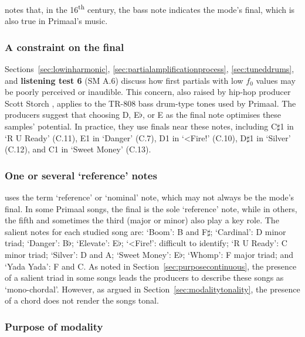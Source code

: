 \documentclass{article}
\begin{document}
\citet[p.~42]{coeurdevey1998histoire} notes that, in the 16\textsuperscript{th} century, the bass note indicates the mode's final, which is also true in Primaal's music. %


\subsubsection{A constraint on the final}

Sections~\ref{sec:lowinharmonic}, \ref{sec:partialamplificationprocess}, \ref{sec:tuneddrums}, and \textbf{listening test 6} (SM A.6) discuss how first partials with low $f_0$ values may be poorly perceived or inaudible. This concern, also raised by hip-hop producer Scott Storch \citep{deruty2024storch}, applies to the TR-808 bass drum-type tones used by Primaal. The producers suggest that choosing D, E$\flat$, or E as the final note optimises these samples' potential. In practice, they use finals near these notes, including C$\sharp$1 in `R U Ready' (C.11), E1 in `Danger' (C.7), D1 in `<Fire!' (C.10), D$\sharp$1 in `Silver' (C.12), and C1 in `Sweet Money' (C.13).


\subsubsection{One or several `reference' notes}

\citet{meeus2023theoretical} uses the term `reference' or `nominal' note, which may not always be the mode's final. In some Primaal songs, the final is the sole `reference' note, while in others, the fifth and sometimes the third (major or minor) also play a key role. The salient notes for each studied song are: `Boom': B and F$\sharp$; `Cardinal': D minor triad; `Danger': B$\flat$; `Elevate': E$\flat$; `<Fire!': difficult to identify; `R U Ready': C minor triad; `Silver': D and A; `Sweet Money': E$\flat$; `Whomp': F major triad; and `Yada Yada': F and C. As noted in Section~\ref{sec:purposecontinuous}, the presence of a salient triad in some songs leads the producers to describe these songs as `mono-chordal'. However, as argued in Section~\ref{sec:modalitytonality}, the presence of a chord does not render the songs tonal.


\subsubsection{Purpose of modality}
\end{document}
